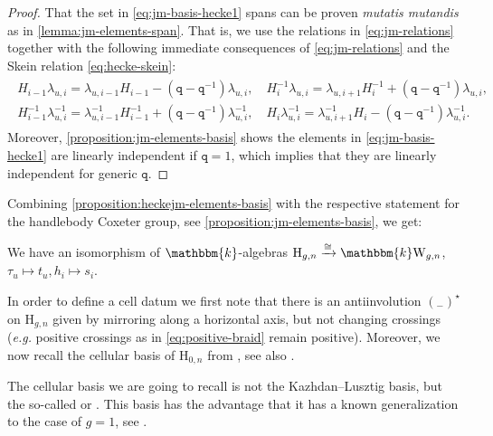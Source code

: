 \documentclass[a4paper,11pt]{amsart}
\let\emph\relax
\newcommand{\eg}{\textsl{e.g.}}
\newcommand{\muta}{\textsl{mutatis mutandis}}
\newcommand{\placeholder}{{}_{-}}
\newcommand{\setstuff}[1]{\mathrm{#1}}
\newcommand{\KK}{\mathbbm{k}}
\newcommand{\varsym}[1]{\mathtt{#1}}
\newcommand{\qvar}{\varsym{q}}
\numberwithin{equation}{section}
\let\fullref\autoref
\begin{document}
\begin{proof}
That the set in \eqref{eq:jm-basis-hecke1} spans can be proven {\muta} as 
in \fullref{lemma:jm-elements-span}. 
That is, we use the relations in \eqref{eq:jm-relations} 
together with the following immediate consequences 
of \eqref{eq:jm-relations} and the Skein relation \eqref{eq:hecke-skein}:
\begin{gather}\label{eq:hecke-pull}
\begin{gathered}
H_{i-1}\lambda_{u,i}
=
\lambda_{u,i-1}H_{i-1}
-(\qvar-\qvar^{-1})\lambda_{u,i}
,\quad
H_{i}^{-1}\lambda_{u,i}
=
\lambda_{u,i+1}H_{i}^{-1}
+(\qvar-\qvar^{-1})\lambda_{u,i}
,\\
H_{i-1}^{-1}\lambda_{u,i}^{-1}
=
\lambda_{u,i-1}^{-1}H_{i-1}^{-1}
+(\qvar-\qvar^{-1})\lambda_{u,i}^{-1}
,\quad
H_{i}\lambda_{u,i}^{-1}
=
\lambda_{u,i+1}^{-1}H_{i}
-(\qvar-\qvar^{-1})\lambda_{u,i}^{-1}.
\end{gathered}
\end{gather}
Moreover, 
\fullref{proposition:jm-elements-basis} shows the elements in \eqref{eq:jm-basis-hecke1} are 
linearly independent if $\qvar=1$, which implies that they are linearly independent for generic $\qvar$.
\end{proof}

Combining \fullref{proposition:heckejm-elements-basis} 
with the respective 
statement for the handlebody Coxeter group, see \fullref{proposition:jm-elements-basis}, we get:

\begin{corollary}
We have an isomorphism of $\KK$-algebras $\setstuff{H}_{g,n}\xrightarrow{\cong}\KK\setstuff{W}_{g,n}$, 
$\tau_{u}\mapsto t_{u},h_{i}\mapsto s_{i}$.
\end{corollary}

In order to define a cell datum we first note that
there is an antiinvolution $(\placeholder)^{\star}$ 
on $\setstuff{H}_{g,n}$ given by mirroring along a horizontal 
axis, but not changing crossings ({\eg} positive crossings
as in \eqref{eq:positive-braid} remain positive).
Moreover, we now recall the 
cellular basis of $\setstuff{H}_{0,n}$ from \cite{Mu-typea-hecke}, see also \cite[Chapter 3]{Ma-hecke-schur}. 

\begin{remark}
The cellular basis we are going to recall is not the Kazhdan--Lusztig 
basis, but the so-called \emph{Murphy basis} or
\emph{standard basis}. This basis 
has the advantage that it has a known generalization to the case of $g=1$, 
see \cite{DiJaMa-cyclotomic-q-schur}.
\end{remark}
\end{document}
